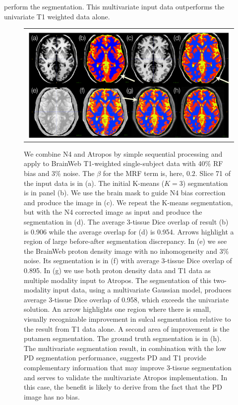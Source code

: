 \documentclass[11pt,english]{article}
\begin{document}
perform the segmentation.  This multivariate input data outperforms
the univariate T1 weighted data alone.
\begin{figure}
\begin{center}
\begin{tabular}{c}
\includegraphics[width=6in]{Figures/bwebN4ex.pdf}
\end{tabular}
\caption{\baselineskip 12pt \small We combine N4 and Atropos by simple
sequential processing and apply to BrainWeb T1-weighted single-subject
data with 40\% RF bias and 3\% noise.  The $\beta$ for the MRF term
is, here, $0.2$.  Slice 71 of the input data is in (a).  The initial
K-means ($K=3$) segmentation is in panel (b).  We use the brain mask
to guide N4 bias correction and produce the image in (c).  We
repeat the K-means segmentation, but with the N4 corrected image as
input and produce the segmentation in (d).  The average 3-tissue Dice
overlap of result (b) is 0.906 while the average overlap for (d) is
0.954.  Arrows highlight a region of large before-after segmentation
discrepancy.  In (e) we see the BrainWeb proton density image with no
inhomogeneity and 3\% noise.  Its segmentation is in (f) with average
3-tissue Dice overlap of 0.895.  In (g) we use both proton density
data and T1 data as multiple modality input to Atropos.  The segmentation
of this two-modality input data, using a multivariate Gaussian model,
produces average 3-tissue Dice overlap of 0.958, which exceeds
the univariate solution.  An arrow highlights one region where there
is small, visually recognizable improvement in sulcal segmentation
relative to the result from T1 data alone.  A second area of
improvement is the putamen segmentation.  The ground truth
segmentation is in (h).  The multivariate segmentation result, in
combination with the low PD segmentation performance, suggests PD and
T1 provide complementary information that may improve 3-tissue
segmentation and serves to validate the multivariate Atropos
implementation.  In this case, the benefit is likely to derive from
the fact that the PD image has no bias.
}
\label{fig:bwebrf40}
\end{center}
\end{figure}
\end{document}
